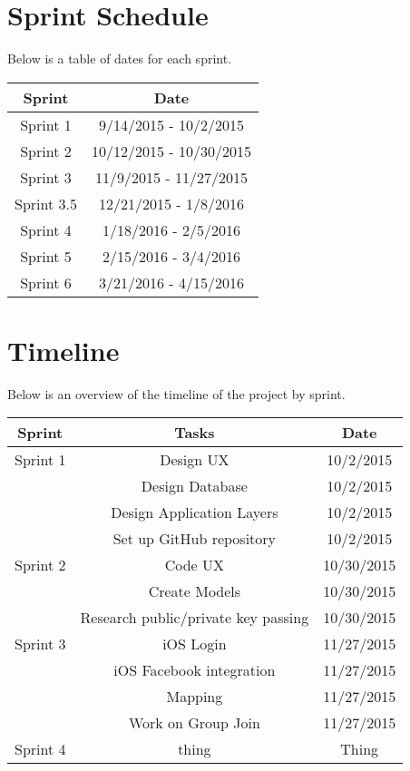 \section{Sprint Schedule}
Below is a table of dates for each sprint.\\
\begin{center}
	\begin{tabular}{|c|c|}
	\hline
	Sprint & Date\\
	\hline
	Sprint 1 & 9/14/2015 - 10/2/2015\\
	\hline
	Sprint 2 & 10/12/2015 - 10/30/2015\\
	\hline
	Sprint 3 & 11/9/2015 - 11/27/2015\\
	\hline
	Sprint 3.5 & 12/21/2015 - 1/8/2016\\
	\hline
	Sprint 4 & 1/18/2016 - 2/5/2016\\
	\hline
	Sprint 5 & 2/15/2016 - 3/4/2016\\
	\hline
	Sprint 6 & 3/21/2016 - 4/15/2016\\
	\hline
	\end{tabular}
\end{center}

\section{Timeline}
Below is an overview of the timeline of the project by sprint.
\begin{center}
	\begin{tabular}{c|c|c}
	Sprint & Tasks & Date\\
	\hline
	Sprint 1 &  Design UX & 10/2/2015\\
	& Design Database& 10/2/2015\\
	& Design Application Layers & 10/2/2015\\
	& Set up GitHub repository & 10/2/2015\\
	\hline
	Sprint 2 & Code UX & 10/30/2015 \\
	& Create Models & 10/30/2015\\
	& Research public/private key passing & 10/30/2015\\
	\hline
	Sprint 3 & iOS Login & 11/27/2015\\
	& iOS Facebook integration & 11/27/2015\\
	& Mapping & 11/27/2015\\
	& Work on Group Join & 11/27/2015\\
	\hline
	Sprint 4 & thing & Thing\\
	\hline
	\end{tabular}
\end{center}

